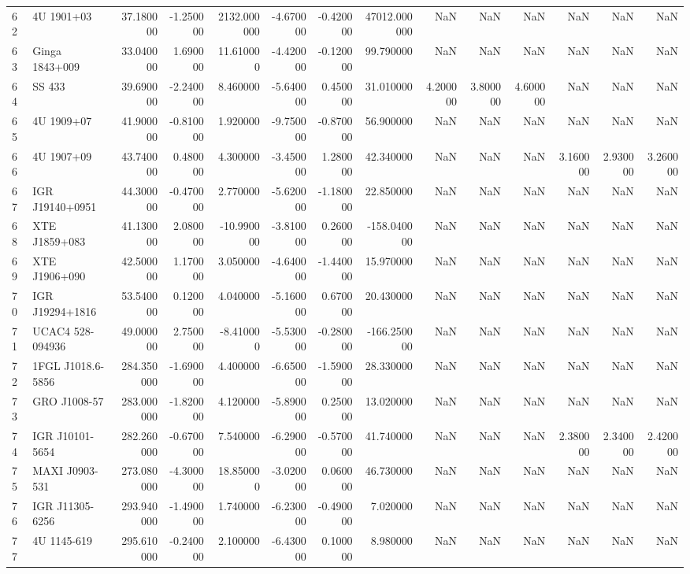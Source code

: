 \begin{tabular}{llrrrrrrrrrrrr}
62 & 4U 1901+03 & 37.180000 & -1.250000 & 2132.000000 & -4.670000 & -0.420000 & 47012.000000 & NaN & NaN & NaN & NaN & NaN & NaN \\
63 & Ginga 1843+009 & 33.040000 & 1.690000 & 11.610000 & -4.420000 & -0.120000 & 99.790000 & NaN & NaN & NaN & NaN & NaN & NaN \\
64 & SS 433 & 39.690000 & -2.240000 & 8.460000 & -5.640000 & 0.450000 & 31.010000 & 4.200000 & 3.800000 & 4.600000 & NaN & NaN & NaN \\
65 & 4U 1909+07 & 41.900000 & -0.810000 & 1.920000 & -9.750000 & -0.870000 & 56.900000 & NaN & NaN & NaN & NaN & NaN & NaN \\
66 & 4U 1907+09 & 43.740000 & 0.480000 & 4.300000 & -3.450000 & 1.280000 & 42.340000 & NaN & NaN & NaN & 3.160000 & 2.930000 & 3.260000 \\
67 & IGR J19140+0951 & 44.300000 & -0.470000 & 2.770000 & -5.620000 & -1.180000 & 22.850000 & NaN & NaN & NaN & NaN & NaN & NaN \\
68 & XTE J1859+083 & 41.130000 & 2.080000 & -10.990000 & -3.810000 & 0.260000 & -158.040000 & NaN & NaN & NaN & NaN & NaN & NaN \\
69 & XTE J1906+090 & 42.500000 & 1.170000 & 3.050000 & -4.640000 & -1.440000 & 15.970000 & NaN & NaN & NaN & NaN & NaN & NaN \\
70 & IGR J19294+1816 & 53.540000 & 0.120000 & 4.040000 & -5.160000 & 0.670000 & 20.430000 & NaN & NaN & NaN & NaN & NaN & NaN \\
71 & UCAC4 528-094936 & 49.000000 & 2.750000 & -8.410000 & -5.530000 & -0.280000 & -166.250000 & NaN & NaN & NaN & NaN & NaN & NaN \\
72 & 1FGL J1018.6-5856 & 284.350000 & -1.690000 & 4.400000 & -6.650000 & -1.590000 & 28.330000 & NaN & NaN & NaN & NaN & NaN & NaN \\
73 & GRO J1008-57 & 283.000000 & -1.820000 & 4.120000 & -5.890000 & 0.250000 & 13.020000 & NaN & NaN & NaN & NaN & NaN & NaN \\
74 & IGR J10101-5654 & 282.260000 & -0.670000 & 7.540000 & -6.290000 & -0.570000 & 41.740000 & NaN & NaN & NaN & 2.380000 & 2.340000 & 2.420000 \\
75 & MAXI J0903-531 & 273.080000 & -4.300000 & 18.850000 & -3.020000 & 0.060000 & 46.730000 & NaN & NaN & NaN & NaN & NaN & NaN \\
76 & IGR J11305-6256 & 293.940000 & -1.490000 & 1.740000 & -6.230000 & -0.490000 & 7.020000 & NaN & NaN & NaN & NaN & NaN & NaN \\
77 & 4U 1145-619 & 295.610000 & -0.240000 & 2.100000 & -6.430000 & 0.100000 & 8.980000 & NaN & NaN & NaN & NaN & NaN & NaN \\

\end{tabular}
